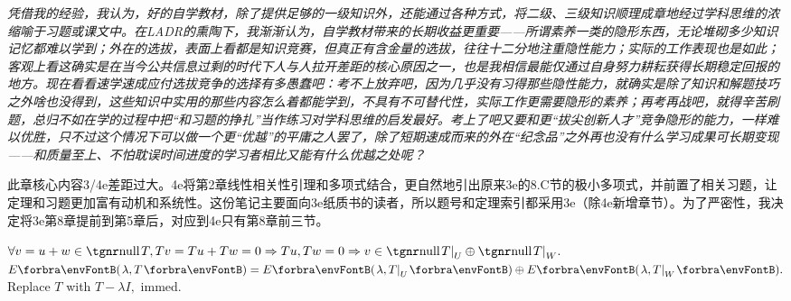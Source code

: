 \vfill\textsl{\normalsize 凭借我的经验，我认为，好的自学教材，除了提供足够的一级知识外，还能通过各种方式，将二级、\!三级知识顺理成章地经过学科思维的浓缩喻于习题或课文中。在LADR的熏陶下，我渐渐认为，自学教材带来的长期收益更重要——所谓素养一类的隐形东西，无论堆砌多少知识记忆都难以学到；外在的选拔，表面上看都是知识竞赛，但真正有含金量的选拔，往往十二分地注重隐性能力；实际的工作表现也是如此；客观上看这确实是在当今公共信息过剩的时代下人与人拉开差距的核心原因之一，也是我相信最能仅通过自身努力耕耘获得长期稳定回报的地方。现在看看速学速成应付选拔竞争的选择有多愚蠢吧：考不上放弃吧，因为几乎没有习得那些隐性能力，就确实是除了知识和解题技巧之外啥也没得到，这些知识中实用的那些内容怎么着都能学到，不具有不可替代性，实际工作更需要隐形的素养；再考再战吧，就得辛苦刷题，总归不如在学的过程中把\!“和习题的挣扎”\!当作练习对学科思维的启发最好。考上了吧又要和更\!“拔尖创新人才”\!竞争隐形的能力，一样难以优胜，只不过这个情况下可以做一个更\!“优越”\!的平庸之人罢了，除了短期速成而来的外在\!“纪念品”\!之外再也没有什么学习成果可长期变现——和质量至上、\!不怕耽误时间进度的学习者相比又能有什么优越之处呢？}\par\vspace{4pt}

{\small
此章核心内容3/4e差距过大。4e将第2章线性相关性引理和多项式结合，更自然地引出原来3e的8.C节的极小多项式，并前置了相关习题，让定理和习题更加富有动机和系统性。这份笔记主要面向3e纸质书的读者，所以题号和定理索引都采用3e（除4e新增章节）。为了严密性，我决定将3e第8章提前到第5章后，对应到4e只有第8章前三节。\par\vspace{14pt}
}\pagebreak


\vspace{4pt}


$\forall v=u+w\in\null T, Tv=Tu+Tw=0\Rightarrow Tu,Tw=0\Rightarrow v\in\null T\mmid_U\oplus\null T\mmid_W.$\PfEnd
\ACoro $E\Par{\lambda,T}=E\Par{\lambda,T\mmid_U}\oplus E\Par{\lambda,T\mmid_W}.$ Replace $T$ with $T-\lambda I,$ immed.
\SepLine

